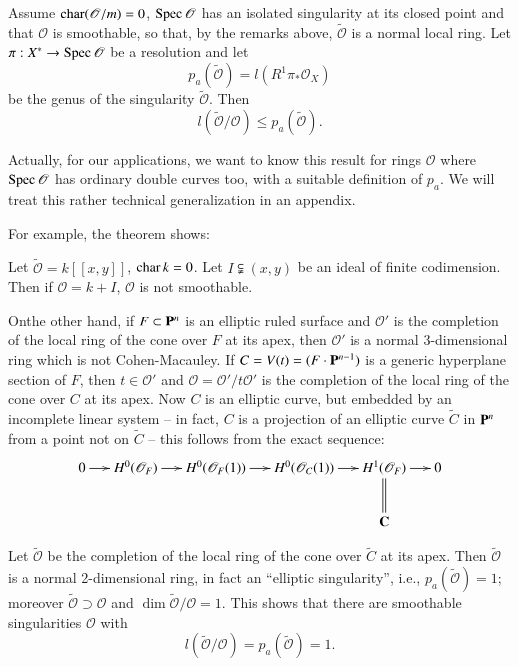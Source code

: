 \begin{theorem*}
Assume $\operatorname{char}(\mathscr{O}/m)=0$, $\operatorname{Spec} \mathscr{O}$ has an isolated
singularity at its closed point and that $\mathscr{O}$ is smoothable,
so that, by the remarks above, $\widetilde{\mathscr{O}}$ is a normal
local ring. Let $\pi:X^{*}\to \operatorname{Spec} \mathscr{O}$ be a resolution and
let
$$
p_{a}(\widetilde{\mathscr{O}})=l(R^{1}\pi_{*}\mathscr{O}_{X})
$$
be the genus of the singularity $\widetilde{\mathscr{O}}$. Then
$$
l(\widetilde{\mathscr{O}}/\mathscr{O})\leq
p_{a}(\widetilde{\mathscr{O}}). 
$$
\end{theorem*}

Actually, for our applications, we want to know this result for rings
$\mathscr{O}$ where $\operatorname{Spec} \mathscr{O}$ has ordinary double curves
too, with a suitable definition of $p_{a}$. We will treat this rather
technical generalization in an appendix.

For example, the theorem shows:

\begin{coro*}
Let $\widetilde{\mathscr{O}}=k[[x,y]]$, $\operatorname{char} k=0$. Let $I\subsetneqq
(x,y)$ be an ideal of finite codimension. Then if $\mathscr{O}=k+I$,
$\mathscr{O}$ is not smoothable.
\end{coro*}

On\pageoriginale the other hand, if $F\subset \mathbf{P}^{n}$ is an elliptic
ruled surface and $\mathscr{O}'$ is the completion of the local ring
of the cone over $F$ at its apex, then $\mathscr{O}'$ is a normal
3-dimensional ring which is not Cohen-Macauley. If
$C=V(t)=(F\cdot \mathbf{P}^{n-1})$ is a generic hyperplane section of $F$,
then $t\in \mathscr{O}'$ and $\mathscr{O}=\mathscr{O}'/t\mathscr{O}'$
is the completion of the local ring of the cone over $C$ at its
apex. Now $C$ is an elliptic curve, but embedded by an incomplete
linear system -- in fact, $C$ is a projection of an elliptic curve
$\widetilde{C}$ in $\mathbf{P}^{n}$ from a point not on $\widetilde{C}$ --
this follows from the exact sequence:
\[
\xymatrix@C=.5cm{
0\ar[r] & H^{0}(\mathscr{O}_{F})\ar[r] &
H^{0}(\mathscr{O}_{F}(1))\ar[r] & H^{0}(\mathscr{O}_{C}(1))\ar[r] &
H^{1}(\mathscr{O}_{F})\ar@{=}[d]\ar[r] & 0\\
 & & & & \bfC & 
}
\]

Let $\widetilde{\mathscr{O}}$ be the completion of the local ring of
the cone over $\widetilde{C}$ at its apex. Then
$\widetilde{\mathscr{O}}$ is a normal 2-dimensional ring, in fact an
``elliptic singularity'', i.e., $p_{a}(\widetilde{\mathscr{O}})=1$;
moreover $\widetilde{\mathscr{O}}\supset \mathscr{O}$ and
$\dim \widetilde{\mathscr{O}}/\mathscr{O}=1$. This shows that there
are smoothable singularities $\mathscr{O}$ with
$$
l(\widetilde{\mathscr{O}}/\mathscr{O})=p_{a}(\widetilde{\mathscr{O}})=1.
$$

